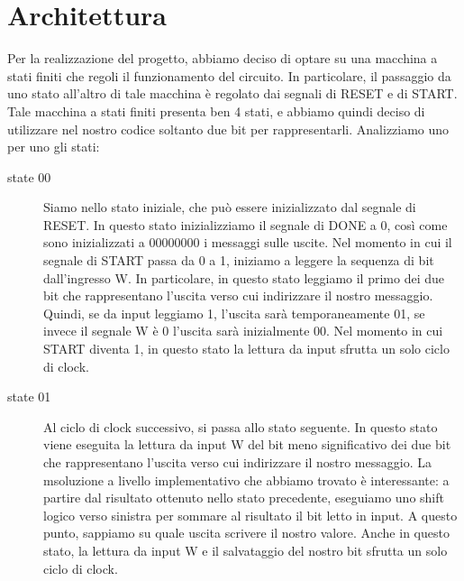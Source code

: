 \documentclass{article}
\begin{document}
\section{Architettura}
Per la realizzazione del progetto, abbiamo deciso di optare su una macchina a stati finiti che regoli il funzionamento del circuito.
In particolare, il passaggio da uno stato all'altro di tale macchina è regolato dai segnali di RESET e di START.
Tale macchina a stati finiti presenta ben 4 stati, e abbiamo quindi deciso di utilizzare nel nostro codice soltanto due bit per rappresentarli.
Analizziamo uno per uno gli stati:

\begin{description}
\item[state 00]
Siamo nello stato iniziale, che può essere inizializzato dal segnale di RESET.
In questo stato inizializziamo il segnale di DONE a 0, così come sono inizializzati a 00000000 i messaggi sulle uscite.
Nel momento in cui il segnale di START passa da 0 a 1, iniziamo a leggere la sequenza di bit dall'ingresso W. In particolare, in questo stato leggiamo il primo dei due bit che rappresentano l'uscita verso cui indirizzare il nostro messaggio. Quindi, se da input leggiamo 1, l'uscita sarà temporaneamente 01, se invece il segnale W è 0 l'uscita sarà inizialmente 00. Nel momento in cui START diventa 1, in questo stato la lettura da input sfrutta un solo ciclo di clock.

\item[state 01]
Al ciclo di clock successivo, si passa allo stato seguente. In questo stato viene eseguita la lettura da input W del bit meno significativo dei due bit che rappresentano l'uscita verso cui indirizzare il nostro messaggio. La msoluzione a livello implementativo che abbiamo trovato è interessante: a partire dal risultato ottenuto nello stato precedente, eseguiamo uno shift logico verso sinistra per sommare al risultato il bit letto in input. A questo punto, sappiamo su quale uscita scrivere il nostro valore. Anche in questo stato, la lettura da input W e il salvataggio del nostro bit sfrutta un solo ciclo di clock.


\end{description}
\end{document}
